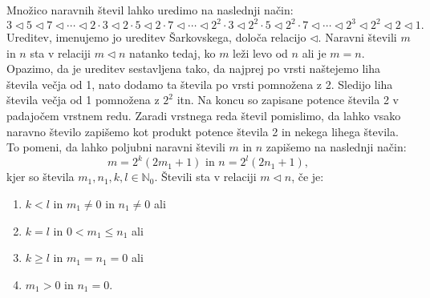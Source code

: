 \documentclass[mat2]{fmfdelo}
\newcommand{\N}{\mathbb N}
\begin{document}
\begin{definicija}
Množico naravnih števil lahko uredimo na naslednji način:
$$3 \triangleleft 5 \triangleleft 7 \triangleleft \cdots \triangleleft 2\cdot 3 \triangleleft 2\cdot 5 \triangleleft 2\cdot 7 \triangleleft \cdots \triangleleft 2^2\cdot 3 \triangleleft 2^2\cdot 5 \triangleleft 2^2\cdot 7 \triangleleft \cdots \triangleleft 2^3 \triangleleft 2^2 \triangleleft 2 \triangleleft 1.$$
Ureditev, imenujemo jo ureditev Šarkovskega, določa relacijo $\triangleleft$. Naravni števili $m$ in $n$ sta v relaciji $m\triangleleft n$ natanko tedaj, ko $m$ leži levo od $n$ ali je $m=n$. Opazimo, da je ureditev sestavljena tako, da najprej po vrsti naštejemo liha števila večja od 1, nato dodamo ta števila po vrsti pomnožena z 2. Sledijo liha števila večja od 1 pomnožena z $2^2$ itn. Na koncu so zapisane potence števila 2 v padajočem vrstnem redu. Zaradi vrstnega reda števil pomislimo, da lahko vsako naravno število zapišemo kot produkt potence števila 2 in nekega lihega števila. To pomeni, da lahko poljubni naravni števili $m$ in $n$ zapišemo na naslednji način: 
\begin{equation}
m= 2^k(2m_1 +1)\text{ in } n= 2^l(2n_1 +1), \label{eq:zapis}
\end{equation}
 kjer so števila $m_1, n_1, k, l \in \N_0$. Števili sta v relaciji $m \triangleleft n$, če je:
\begin{enumerate}[label={(R\arabic*)}]
\item $k<l$ in $m_1 \neq 0$ in $n_1 \neq 0$ ali \label{rel1}
\item $k=l$ in $0<m_1 \leq n_1$ ali \label{rel2}
\item $k \geq l$ in $m_1 = n_1=0$ ali \label{rel3}
\item $m_1>0$ in $n_1 =0$. \label{rel4}
\end{enumerate}
\end{definicija}
\end{document}
